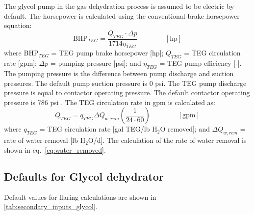 \documentclass[11pt]{report}
\newcommand{\eqnunit}[1]{\quad\quad \scriptstyle{\left[\text{#1}\right]}}
\begin{document}
The glycol pump in the gas dehydration process is assumed to be electric by default. The horsepower is calculated using the conventional brake horsepower equation: 
\begin{equation} \label{eq:BHP_glycol_pump}
\text{BHP}_{TEG}=\frac{Q_{TEG}\cdot \Delta p}{1714 \eta_{TEG}} \quad\quad\eqnunit{hp}
\end{equation}
where BHP$_{TEG}$ = TEG pump brake horsepower [hp]; $Q_{TEG}$ = TEG circulation rate [gpm]; $\Delta p$ = pumping pressure [psi]; and $\eta_{TEG}$ = TEG pump efficiency [-]. The pumping pressure is the difference between pump discharge and suction pressures. The default pump suction pressure is 0 psi. The TEG pump discharge pressure is equal to contactor operating pressure. The default contactor operating pressure is 786 psi \cite[p. 160]{Manning1991}. The TEG circulation rate in gpm is calculated as: 
\begin{equation} \label{eq:glycol_circulation_rate}
Q_{TEG}= q_{TEG} \Delta Q_{w,rem} \left( \frac{1}{24\cdot60} \right) \quad\quad\eqnunit{gpm}
\end{equation}
where $q_{TEG}$ = TEG circulation rate [gal TEG/lb H$_{2}$O removed]; and $\Delta Q_{w,rem}$ = rate of water removal [lb H$_{2}$O/d]. The calculation of the rate of water removal is shown in eq.\ \eqref{eq:water_removed}.

\subsection{Defaults for Glycol dehydrator}

Default values for flaring calculations are shown in \ref{tab:secondary_inputs_glycol}.

\end{document}
